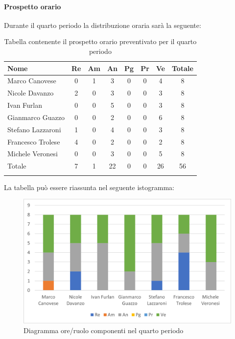 	\paragraph{Prospetto orario}
			Durante il quarto periodo la distribuzione oraria sarà la seguente:
			
			\begin{longtable}{|l|c|c|c|c|c|c|c|}
				\hline
				\rowcolor{lighter-grayer}
				\textbf{Nome} & \textbf{Re} & \textbf{Am} & \textbf{An} & \textbf{Pg}  & \textbf{Pr}   & \textbf{Ve} & \textbf{Totale} \\
				\hline
				\endfirsthead
				
				\hline
				Marco Canovese & 0 & 1 & 3 & 0 & 0 & 4 & 8\\
				\hline
				\hline
				Nicole Davanzo & 2 & 0 & 3 & 0 & 0 & 3 & 8\\
				\hline
				\hline
				Ivan Furlan & 0 & 0 & 5 & 0 & 0 & 3 & 8\\
				\hline
				\hline
				Gianmarco Guazzo & 0 & 0 & 2 & 0 & 0 & 6 & 8\\
				\hline
				\hline
				Stefano Lazzaroni & 1 & 0 &4 & 0 & 0 & 3 & 8\\
				\hline
				\hline
				Francesco Trolese & 4 & 0 & 2 & 0 & 0 & 2 & 8\\
				\hline
				\hline
				Michele Veronesi & 0 & 0 & 3 & 0 & 0 & 5 & 8\\
				\hline 
				\hline
				Totale & 7 & 1 & 22 & 0 & 0 & 26 & 56\\
				\hline
				\rowcolor{white} 
				\caption{Tabella contenente il prospetto orario preventivato per il quarto periodo}
			\end{longtable}

		
			La tabella può essere riassunta nel seguente istogramma:
		
			\begin{figure}[H]
				\centering
				\includegraphics[width=0.8\linewidth]{res/images/preventivo/dettaglio_analisi/4-1.png}
				\caption{Diagramma ore/ruolo componenti nel quarto periodo}
				\label{fig:diagramma suddivisione ruoli quarto periodo analisi}
			\end{figure}
		
